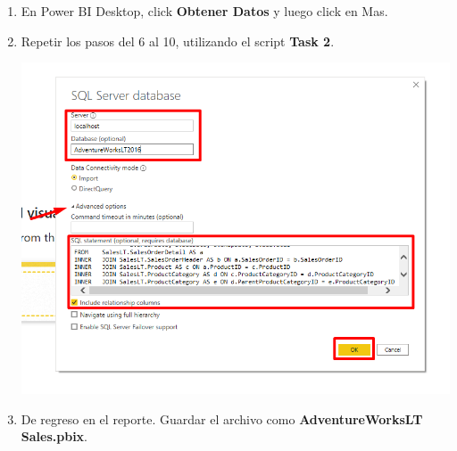 \documentclass[12pt,letterpaper]{article}
\newcommand\tab[1][1cm]{\hspace*{#1}}
\begin{document}
\begin{enumerate}[\tab 1.]
        \item En Power BI Desktop, click \textbf{Obtener Datos} y luego click en Mas.
        \item Repetir los pasos del 6 al 10, utilizando el script \textbf{Task 2}.
        \begin{center}
            \includegraphics[width=13cm]{./img/img12.png}
        \end{center}
        \item De regreso en el reporte. Guardar el archivo como \textbf{AdventureWorksLT Sales.pbix}.
    \end{enumerate}
\end{document}
